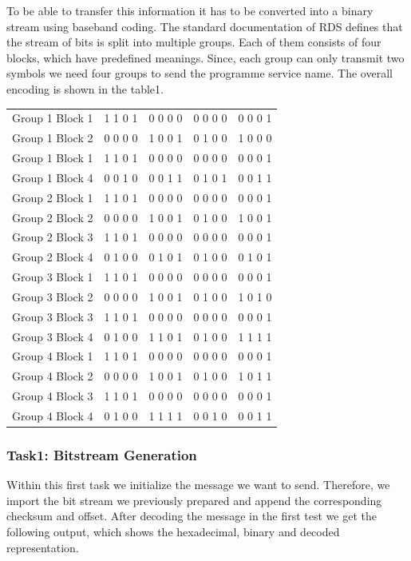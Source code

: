 \documentclass[sigconf]{acmart}
\begin{document}
To be able to transfer this information it has to be converted into a binary stream using baseband
coding. The standard documentation\cite{rds_standard} of RDS defines that the stream of bits is split into
multiple groups. Each of them consists of four blocks, which have predefined meanings. Since, each
group can only transmit two symbols we need four groups to send the programme service name. The
overall encoding is shown in the table1.


\begin{center}
  \begin{tabular}{ l | c | c | c | r}
    \hline
Group 1 Block 1 & 1 1 0 1 & 0 0 0 0 & 0 0 0 0 & 0 0 0 1\tabularnewline
Group 1 Block 2 & 0 0 0 0 & 1 0 0 1 & 0 1 0 0 & 1 0 0 0\tabularnewline
Group 1 Block 1 & 1 1 0 1 & 0 0 0 0 & 0 0 0 0 & 0 0 0 1\tabularnewline
Group 1 Block 4 & 0 0 1 0 & 0 0 1 1 & 0 1 0 1 & 0 0 1 1\tabularnewline
Group 2 Block 1 & 1 1 0 1 & 0 0 0 0 & 0 0 0 0 & 0 0 0 1\tabularnewline
Group 2 Block 2 & 0 0 0 0 & 1 0 0 1 & 0 1 0 0 & 1 0 0 1\tabularnewline
Group 2 Block 3 & 1 1 0 1 & 0 0 0 0 & 0 0 0 0 & 0 0 0 1\tabularnewline
Group 2 Block 4 & 0 1 0 0 & 0 1 0 1 & 0 1 0 0 & 0 1 0 1\tabularnewline
Group 3 Block 1 & 1 1 0 1 & 0 0 0 0 & 0 0 0 0 & 0 0 0 1\tabularnewline
Group 3 Block 2 & 0 0 0 0 & 1 0 0 1 & 0 1 0 0 & 1 0 1 0\tabularnewline
Group 3 Block 3 & 1 1 0 1 & 0 0 0 0 & 0 0 0 0 & 0 0 0 1\tabularnewline
Group 3 Block 4 & 0 1 0 0 & 1 1 0 1 & 0 1 0 0 & 1 1 1 1\tabularnewline
Group 4 Block 1 & 1 1 0 1 & 0 0 0 0 & 0 0 0 0 & 0 0 0 1\tabularnewline
Group 4 Block 2 & 0 0 0 0 & 1 0 0 1 & 0 1 0 0 & 1 0 1 1\tabularnewline
Group 4 Block 3 & 1 1 0 1 & 0 0 0 0 & 0 0 0 0 & 0 0 0 1\tabularnewline
Group 4 Block 4 & 0 1 0 0 & 1 1 1 1 & 0 0 1 0 & 0 0 1 1\tabularnewline
    \hline
  \end{tabular}
\end{center}

\hypertarget{Task1:ux20Bitstreamux20Generation}{%
\subsubsection{Task1: Bitstream
Generation}\label{Task1:ux20Bitstreamux20Generation}}

Within this first task we initialize the message we want to send.
Therefore, we import the bit stream we previously prepared and append
the corresponding checksum and offset. After decoding the message in the
first test we get the following output, which shows the hexadecimal,
binary and decoded representation.
\end{document}
